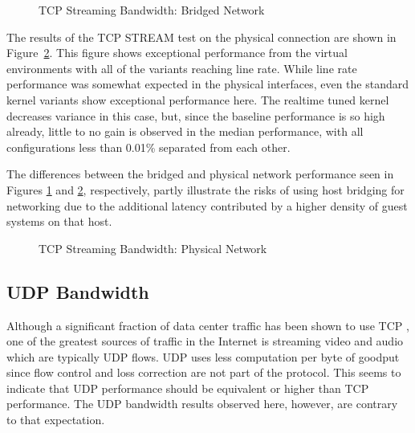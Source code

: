 \begin{figure}
    \centering
    \def\svgwidth{\columnwidth}
    
    \caption{TCP Streaming Bandwidth: Bridged Network}
    \label{fig:tcp_stream_bridge}
\end{figure}

The results of the TCP STREAM test on the physical connection are shown in Figure~\ref{fig:tcp_stream_phys}.
This figure shows exceptional performance from the virtual environments with all of the variants reaching line rate.
While line rate performance was somewhat expected in the physical interfaces, even the standard kernel variants show exceptional performance here.
The realtime tuned kernel decreases variance in this case, but, since the baseline performance is so high already, little to no gain is observed in the median performance, with all configurations less than 0.01\% separated from each other.  

The differences between the bridged and physical network performance seen in Figures \ref{fig:tcp_stream_bridge} and \ref{fig:tcp_stream_phys}, respectively, partly illustrate the risks of using host bridging for networking due to the additional latency contributed by a higher density of guest systems on that host.  

\begin{figure}
    \centering
    \def\svgwidth{\columnwidth}
    
    \caption{TCP Streaming Bandwidth: Physical Network}
    \label{fig:tcp_stream_phys}
\end{figure}

\subsection{UDP Bandwidth} %
\label{sub:udpbandwidth}
Although a significant fraction of data center traffic has been shown to use TCP \autocite{haTCPCloud2013}, one of the greatest sources of traffic in the Internet is streaming video and audio which are typically UDP flows.
UDP uses less computation per byte of goodput since flow control and loss correction are not part of the protocol.  
This seems to indicate that UDP performance should be equivalent or higher than TCP performance.  
The UDP bandwidth results observed here, however, are contrary to that expectation.

